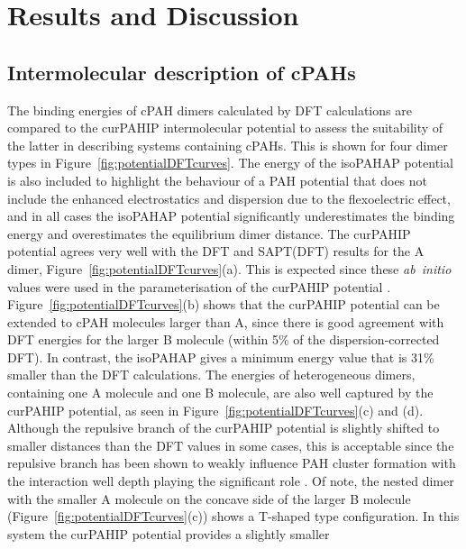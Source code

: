 

\section{Results and Discussion}
%
\subsection{Intermolecular description of cPAHs} 
%
The binding energies of cPAH dimers calculated by DFT calculations are compared to the curPAHIP intermolecular potential to assess the suitability of the latter in describing systems containing cPAHs. This is shown for four dimer types in Figure~\ref{fig:potentialDFTcurves}. The energy of the isoPAHAP potential is also included to highlight the behaviour of a PAH potential that does not include the enhanced electrostatics and dispersion due to the flexoelectric effect, and in all cases the isoPAHAP potential significantly underestimates the binding energy and overestimates the equilibrium dimer distance.
The curPAHIP potential agrees very well with the DFT and SAPT(DFT) results for the A dimer, Figure~\ref{fig:potentialDFTcurves}(a). This is expected since these \textit{ab~initio} values were used in the parameterisation of the curPAHIP potential \cite{bowal2019ion}. 
Figure~\ref{fig:potentialDFTcurves}(b) shows that the curPAHIP potential can be extended to cPAH molecules larger than A, since there is good agreement with DFT energies for the larger B molecule (within 5\% of the dispersion-corrected DFT). In contrast, the isoPAHAP gives a minimum energy value that is 31\% smaller than the DFT calculations.
The energies of heterogeneous dimers, containing one A molecule and one B molecule, are also well captured by the curPAHIP potential, as seen in Figure~\ref{fig:potentialDFTcurves}(c) and (d). Although the repulsive branch of the curPAHIP potential is slightly shifted to smaller distances than the DFT values in some cases, this is acceptable since the repulsive branch has been shown to weakly influence PAH cluster formation with the interaction well depth playing the significant role \cite{Pascazio2017}. Of note, the nested dimer with the smaller A molecule on the concave side of the larger B molecule (Figure~\ref{fig:potentialDFTcurves}(c)) shows a T-shaped type configuration. In this system the curPAHIP potential provides a slightly smaller %

